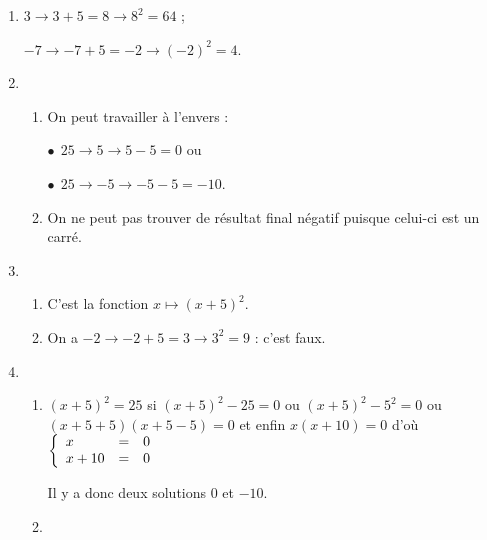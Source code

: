 
\medskip
 
%

\begin{enumerate}
\item %
$3 \to 3 + 5 = 8 \to 8^2 = 64$ ;

$- 7 \to -7 + 5 = - 2 \to (- 2)^2 = 4$. 
\item 
	\begin{enumerate}
		\item %
On peut travailler à l'envers :
		
$\bullet~~$$25 \to 5 \to 5 - 5 = 0$  ou

$\bullet~~$$25 \to - 5 \to -5 - 5 = - 10$. 
		\item %
On ne peut pas trouver de résultat final négatif puisque celui-ci est un carré.
	\end{enumerate} 
\item %
	\begin{enumerate}
		\item %

C'est la fonction $	x \longmapsto (x + 5)^2$.	 
		\item %
On a $- 2 \to - 2 + 5 = 3 \to 3^2 = 9$ : c'est faux. 
	\end{enumerate}		
\item
	\begin{enumerate}
		\item %
$(x + 5)^2 = 25$ si $(x + 5)^2 - 25 = 0$  ou $(x + 5)^2  - 5^2 = 0$ ou $(x + 5 + 5)(x + 5 - 5) = 0$ et enfin $x(x + 10) = 0$ d'où 
$\left\{\begin{array}{l c l}
x	&=&0\\
x+10&=&0\\
\end{array}\right.$

Il y a donc deux solutions $0$ et $- 10$.
		\item %
	\end{enumerate}
\end{enumerate}

\bigskip

